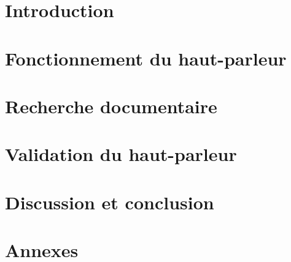 \documentclass{report}
\begin{document}





\clearpage
\tableofcontents
\clearpage

\chapter{Introduction}



\chapter{Fonctionnement du haut-parleur}


\clearpage


\clearpage


\clearpage


\clearpage



\chapter{Recherche documentaire}


\clearpage



\chapter{Validation du haut-parleur}



\chapter{Discussion et conclusion}


\clearpage


\clearpage



\nocite{*}

\chapter{Annexes}


\clearpage


\clearpage


\clearpage


\clearpage


\end{document}
